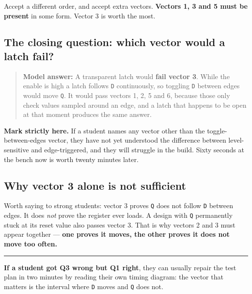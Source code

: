 \documentclass[11pt]{article}
\newcommand{\code}[1]{\texttt{#1}}
\newcommand{\hr}{\vspace{2pt}\hrule\vspace{6pt}}
\begin{document}
Accept a different order, and accept extra vectors. \textbf{Vectors 1, 3 and 5
must be present} in some form. Vector 3 is worth the most.

\subsection*{The closing question: which vector would a latch fail?}

\begin{quote}
\textbf{Model answer:} A transparent latch would \textbf{fail vector 3}. While the
enable is high a latch follows \code{D} continuously, so toggling \code{D} between
edges would move \code{Q}. It would pass vectors 1, 2, 5 and 6, because those only
check values sampled around an edge, and a latch that happens to be open at that
moment produces the same answer.
\end{quote}

\textbf{Mark strictly here.} If a student names any vector other than the
toggle-between-edges vector, they have not yet understood the difference between
level-sensitive and edge-triggered, and they will struggle in the build. Sixty
seconds at the bench now is worth twenty minutes later.

\subsection*{Why vector 3 alone is not sufficient}

Worth saying to strong students: vector 3 proves \code{Q} does not follow \code{D}
between edges. It does \emph{not} prove the register ever loads. A design with
\code{Q} permanently stuck at its reset value also passes vector 3. That is why
vectors 2 and 3 must appear together --- \textbf{one proves it moves, the other
proves it does not move too often.}

\vspace{6pt}
\hr
{\small \textbf{If a student got Q3 wrong but Q1 right}, they can usually repair
the test plan in two minutes by reading their own timing diagram: the vector that
matters is the interval where \code{D} moves and \code{Q} does not.}
\end{document}
